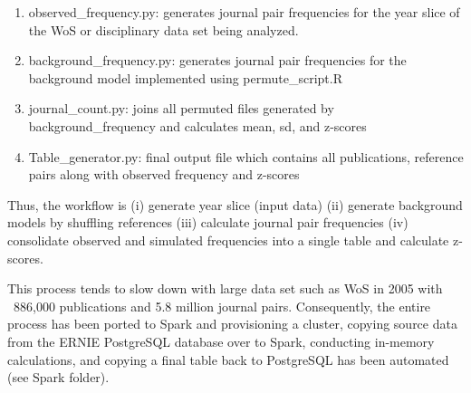 \documentclass{article}
\begin{document}
\begin{enumerate}
\item observed\_frequency.py: generates journal pair frequencies for the year slice of the WoS or disciplinary data set being analyzed.
\item background\_frequency.py: generates journal pair frequencies for the background model implemented using permute\_script.R
\item journal\_count.py: joins all permuted files generated by background\_frequency and calculates mean, sd, and z-scores
\item Table\_generator.py: final output file which contains all publications, reference pairs along with observed frequency and z-scores
\end{enumerate}

Thus, the workflow is (i) generate year slice (input data) (ii) generate background models by shuffling references (iii) calculate journal pair frequencies (iv) consolidate observed and simulated frequencies into a single table and calculate z-scores.

This process tends to slow down with large data set such as WoS in 2005 with ~886,000 publications and 5.8 million
journal pairs. Consequently, the entire process has been ported to Spark and provisioning a cluster, copying source data from the ERNIE PostgreSQL database over to Spark, conducting in-memory calculations, and copying a final table back to PostgreSQL has been automated (see Spark folder).\clearpage
\end{document}
